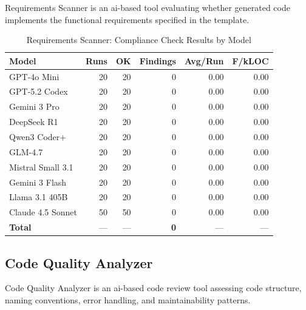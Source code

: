 Requirements Scanner is an ai-based tool evaluating whether generated code implements the functional requirements specified in the template.

\begin{table}[htbp]
    \centering
    \caption{Requirements Scanner: Compliance Check Results by Model}
    \label{tab:tool_reqscanner}
    \small
    \begin{tabular}{@{} l r r r r r @{}}
        \toprule
        \textbf{Model} & \textbf{Runs} & \textbf{OK} & \textbf{Findings} & \textbf{Avg/Run} & \textbf{F/kLOC} \\
        \midrule
        GPT-4o Mini & 20 & 20 & 0 & 0.00 & 0.00 \\
        GPT-5.2 Codex & 20 & 20 & 0 & 0.00 & 0.00 \\
        Gemini 3 Pro & 20 & 20 & 0 & 0.00 & 0.00 \\
        DeepSeek R1 & 20 & 20 & 0 & 0.00 & 0.00 \\
        Qwen3 Coder+ & 20 & 20 & 0 & 0.00 & 0.00 \\
        GLM-4.7 & 20 & 20 & 0 & 0.00 & 0.00 \\
        Mistral Small 3.1 & 20 & 20 & 0 & 0.00 & 0.00 \\
        Gemini 3 Flash & 20 & 20 & 0 & 0.00 & 0.00 \\
        Llama 3.1 405B & 20 & 20 & 0 & 0.00 & 0.00 \\
        Claude 4.5 Sonnet & 50 & 50 & 0 & 0.00 & 0.00 \\
        \midrule
        \textbf{Total} & --- & --- & \textbf{0} & --- & --- \\
        \bottomrule
    \end{tabular}
\end{table}

\subsection{Code Quality Analyzer}

Code Quality Analyzer is an ai-based code review tool assessing code structure, naming conventions, error handling, and maintainability patterns.

